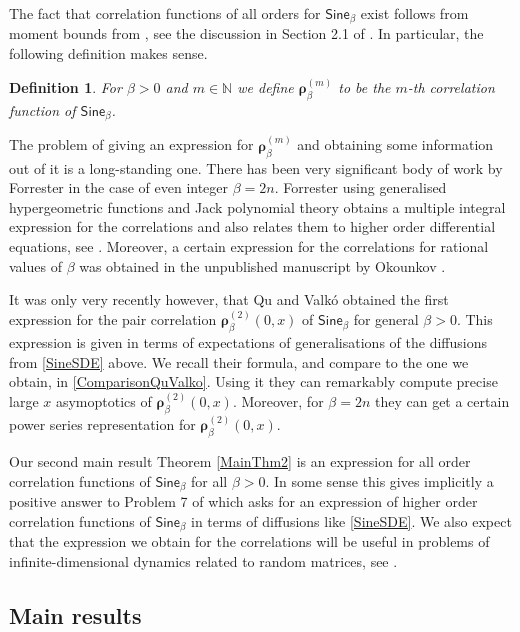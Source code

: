 \documentclass[]{article}
\newtheorem{defn}[thm]{Definition}
\begin{document}
The fact that correlation functions of all orders for $\mathsf{Sine}_\beta$ exist follows from moment bounds from \cite{ValkoViragCarousel}, see the discussion in Section 2.1 of \cite{qu2025pair}. In particular, the following definition makes sense.
\begin{defn}
For $\beta>0$ and $m\in \mathbb{N}$ we define $\boldsymbol{\rho}_\beta^{(m)}$ to be the $m$-th correlation function of $\mathsf{Sine}_\beta$.
\end{defn}
The problem of giving an expression for $\boldsymbol{\rho}_\beta^{(m)}$ and obtaining some information out of it is a long-standing one. There has been very significant body of work by Forrester in the case of even integer $\beta=2n$. Forrester using generalised hypergeometric functions and Jack polynomial theory obtains a multiple integral expression for the correlations and also relates them to higher order differential equations, see \cite{ForresterNuclearPhys,ForresterNuclearPhysAdd,ForresterConj,ForresterBook,ForresterRains,ForresterRahman,ForresterDifferential}. Moreover, a certain expression for the correlations for rational values of $\beta$ was obtained in the unpublished manuscript by Okounkov \cite{Okounkov}.

It was only very recently however, that Qu and Valk\'{o} \cite{qu2025pair} obtained the first expression for the pair correlation $\boldsymbol{\rho}_\beta^{(2)}(0,x)$ of $\mathsf{Sine}_\beta$ for general $\beta>0$. This expression is given in terms of expectations of generalisations of the diffusions from \eqref{SineSDE} above. We recall their formula, and compare to the one we obtain, in \eqref{ComparisonQuValko}. Using it they can remarkably compute precise large $x$ asymoptotics of $\boldsymbol{\rho}_\beta^{(2)}(0,x)$. Moreover, for $\beta=2n$ they can get a certain power series representation for $\boldsymbol{\rho}_\beta^{(2)}(0,x)$.


Our second main result Theorem \ref{MainThm2} is an expression for all order correlation functions of $\mathsf{Sine}_\beta$ for all $\beta>0$.  In some sense this gives implicitly a positive answer to Problem 7 of \cite{qu2025pair} which asks for an expression of higher order correlation functions of $\mathsf{Sine}_\beta$ in terms of diffusions like \eqref{SineSDE}. We also expect that the expression we obtain for the correlations will be useful in problems of infinite-dimensional dynamics related to random matrices, see \cite{Osada1,Osada2,Suzuki1,Suzuki2}.


\subsection{Main results}
\end{document}
